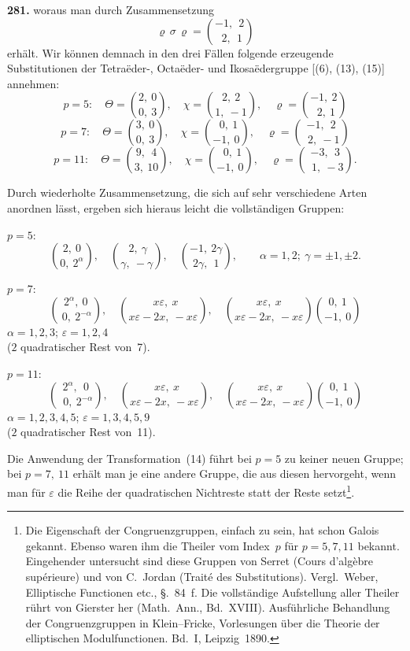 \documentclass[12pt,a4paper]{article}
\begin{document}
\bigskip
\noindent\textbf{281.} woraus man durch Zusammensetzung
\[
\varrho\,\sigma\,\varrho = \binom{-1,\ \ 2}{\ \ 2,\ \ 1}
\]
erh\"alt. Wir k\"onnen demnach in den drei F\"allen folgende erzeugende Substitutionen der Tetra\"eder-, Octa\"eder- und Ikosa\"edergruppe [(6), (13), (15)] annehmen:
\[
p=5:\quad
\Theta = \binom{2,\ 0}{0,\ 3},\quad \chi = \binom{2,\ 2}{1,\ -1},\quad \varrho = \binom{-1,\ 2}{\ \ 2,\ 1}
\]
\[
p=7:\quad
\Theta = \binom{3,\ 0}{0,\ 3},\quad \chi = \binom{\ \ 0,\ 1}{-1,\ 0},\quad \varrho = \binom{-1,\ \ 2}{\ \ 2,\ -1}
\]
\[
p=11:\quad
\Theta = \binom{9,\ \ 4}{3,\ 10},\quad \chi = \binom{\ \ 0,\ 1}{-1,\ 0},\quad \varrho = \binom{-3,\ \ 3}{\ \ 1,\ -3}.
\]

Durch wiederholte Zusammensetzung, die sich auf sehr verschiedene Arten anordnen l\"asst, ergeben sich hieraus leicht die vollst\"andigen Gruppen:

\noindent
$p=5$:
\[
\binom{2,\ 0}{0,\ 2^{\alpha}},\quad \binom{\ 2,\ \gamma}{\gamma,\ -\gamma},\quad
\binom{-1,\ 2\gamma}{2\gamma,\ \ 1},\qquad \alpha=1,2;\ \gamma=\pm 1,\pm 2.
\]

\noindent
$p=7$:
\[
\binom{2^{\alpha},\ 0}{\ 0,\ 2^{-\alpha}},\quad
\binom{\ \ x\varepsilon,\ x}{x\varepsilon - 2x,\ -x\varepsilon},\quad
\binom{x\varepsilon,\ x}{x\varepsilon - 2x,\ -x\varepsilon}\binom{0,\ 1}{-1,\ 0}
\]
$\alpha=1,2,3$; $\varepsilon=1,2,4$\\[2pt]
($2$ quadratischer Rest von~7).

\noindent
$p=11$:
\[
\binom{2^{\alpha},\ \ 0}{\ \ 0,\ 2^{-\alpha}},\quad
\binom{\ \ x\varepsilon,\ x}{x\varepsilon - 2x,\ -x\varepsilon},\quad
\binom{x\varepsilon,\ x}{x\varepsilon - 2x,\ -x\varepsilon}\binom{0,\ 1}{-1,\ 0}
\]
$\alpha=1,2,3,4,5$; $\varepsilon=1,3,4,5,9$\\[2pt]
($2$ quadratischer Rest von~11).

Die Anwendung der Transformation~(14) f\"uhrt bei $p=5$ zu keiner neuen Gruppe; bei $p=7,\ 11$ erh\"alt man je eine andere Gruppe, die aus diesen hervorgeht, wenn man f\"ur $\varepsilon$ die Reihe der quadratischen Nichtreste statt der Reste setzt\footnote{Die Eigenschaft der Congruenzgruppen, einfach zu sein, hat schon Galois gekannt. Ebenso waren ihm die Theiler vom Index~$p$ f\"ur $p=5,7,11$ bekannt. Eingehender untersucht sind diese Gruppen von Serret (Cours d'alg\`ebre sup\'erieure) und von C.~Jordan (Trait\'e des Substitutions). Vergl.~Weber, Elliptische Functionen etc., \S.~84~f. Die vollst\"andige Aufstellung aller Theiler r\"uhrt von Gierster her (Math.~Ann., Bd.~XVIII). Ausf\"uhrliche Behandlung der Congruenzgruppen in Klein--Fricke, Vorlesungen \"uber die Theorie der elliptischen Modulfunctionen. Bd.~I, Leipzig~1890.}.
\end{document}
